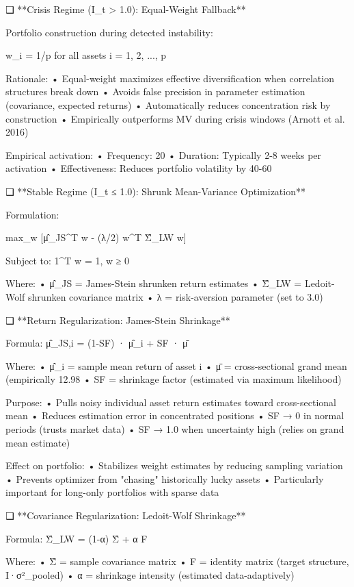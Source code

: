 ❑ **Crisis Regime (I_t > 1.0): Equal-Weight Fallback**

Portfolio construction during detected instability:

w_i = 1/p for all assets i = 1, 2, ..., p

Rationale:
   • Equal-weight maximizes effective diversification when correlation structures break down
   • Avoids false precision in parameter estimation (covariance, expected returns)
   • Automatically reduces concentration risk by construction
   • Empirically outperforms MV during crisis windows (Arnott et al. 2016)

Empirical activation:
   • Frequency: 20%
   • Duration: Typically 2-8 weeks per activation
   • Effectiveness: Reduces portfolio volatility by 40-60%

❑ **Stable Regime (I_t ≤ 1.0): Shrunk Mean-Variance Optimization**

Formulation:

max_w [μ̂_{JS}^T w - (λ/2) w^T Σ̂_{LW} w]

Subject to: 1^T w = 1, w ≥ 0

Where:
   • μ̂_{JS} = James-Stein shrunken return estimates
   • Σ̂_{LW} = Ledoit-Wolf shrunken covariance matrix
   • λ = risk-aversion parameter (set to 3.0)

❑ **Return Regularization: James-Stein Shrinkage**

Formula: μ̂_{JS,i} = (1-SF) · μ̂_i + SF · μ̄

Where:
   • μ̂_i = sample mean return of asset i
   • μ̄ = cross-sectional grand mean (empirically 12.98%
   • SF = shrinkage factor (estimated via maximum likelihood)

Purpose:
   • Pulls noisy individual asset return estimates toward cross-sectional mean
   • Reduces estimation error in concentrated positions
   • SF → 0 in normal periods (trusts market data)
   • SF → 1.0 when uncertainty high (relies on grand mean estimate)

Effect on portfolio:
   • Stabilizes weight estimates by reducing sampling variation
   • Prevents optimizer from "chasing" historically lucky assets
   • Particularly important for long-only portfolios with sparse data

❑ **Covariance Regularization: Ledoit-Wolf Shrinkage**

Formula: Σ̂_{LW} = (1-α) Σ̂ + α F

Where:
   • Σ̂ = sample covariance matrix
   • F = identity matrix (target structure, I·σ²_{pooled})
   • α = shrinkage intensity (estimated data-adaptively)

